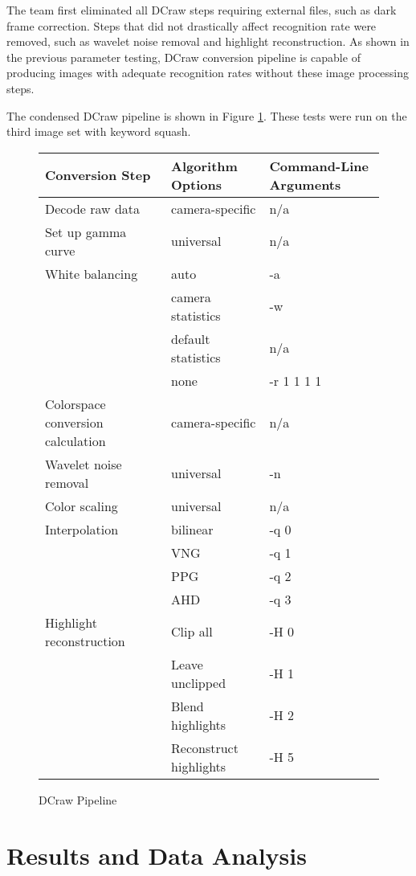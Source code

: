 \documentclass{report}
\begin{document}
		
		The team first eliminated all DCraw steps requiring external files, such as dark frame correction. Steps that did not drastically affect recognition rate were removed, such as wavelet noise removal and highlight reconstruction. As shown in the previous parameter testing, DCraw conversion pipeline is capable of producing images with adequate recognition rates without these image processing steps. 
		
		The condensed DCraw pipeline is shown in Figure \ref{condenseddcraw}. These tests were run on the third image set with keyword squash.
		
		\begin{figure}
			\begin{center}
				\label{condenseddcraw}
				\caption{DCraw Pipeline}
				\begin{tabular}{lll}
					Conversion Step & Algorithm Options & Command-Line Arguments\\
					\hline
					Decode raw data & camera-specific & n/a\\
					Set up gamma curve & universal & n/a\\
					White balancing & auto & -a\\
					& camera statistics & -w\\
					& default statistics & n/a \\
					& none & -r 1 1 1 1 \\
					Colorspace conversion calculation & camera-specific & n/a\\
					Wavelet noise removal & universal & -n \\
					Color scaling & universal & n/a \\
					Interpolation & bilinear & -q 0 \\
					& VNG & -q 1 \\
					& PPG & -q 2 \\
					& AHD & -q 3 \\
					Highlight reconstruction & Clip all & -H 0 \\
					& Leave unclipped & -H 1 \\
					& Blend highlights & -H 2 \\
					& Reconstruct highlights & -H 5 \\
				\end{tabular}
					
			\end{center}
		\end{figure}
		
	\section{Results and Data Analysis}
\end{document}
